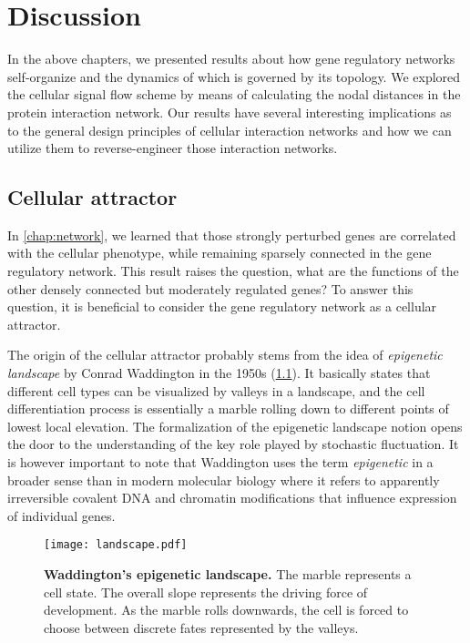 \chapter{Discussion}
In the above chapters, we presented results about how gene regulatory networks
self-organize and the dynamics of which is governed by its topology. We explored
the cellular signal flow scheme by means of calculating the nodal distances in
the protein interaction network. Our results have several interesting implications
as to the general design principles of cellular interaction networks and
how we can utilize them to reverse-engineer those interaction networks.

\section{Cellular attractor}
In \ref{chap:network}, we learned that those strongly perturbed genes are
correlated with the cellular phenotype, while remaining sparsely connected in
the gene regulatory network. This result raises the question, what are the
functions of the other densely connected but moderately regulated genes? 
To answer this question, it is beneficial to consider the gene regulatory network
as a cellular attractor.

The origin of the cellular attractor probably stems from the idea of 
\emph{epigenetic landscape} by Conrad Waddington in the 1950s 
(\ref{fig:landscape}). It basically
states that different cell types can be visualized by valleys in a landscape,
and the cell differentiation process is essentially a marble rolling down to
different points of lowest local elevation. The formalization of the epigenetic landscape notion opens the door to the understanding of the key role played by stochastic fluctuation. 
It is however important to note that Waddington uses the term \emph{epigenetic} in a broader sense than in modern molecular biology where it refers to apparently irreversible covalent DNA and chromatin modifications that influence expression of individual genes.

\begin{figure}[!ht]
\begin{center}
\texttt{[image: landscape.pdf]}
\end{center}
\caption[Waddington's epigenetic landscape]{
{\bf Waddington's epigenetic landscape.}
The marble represents a cell state. The overall slope represents the driving force of development. As the marble rolls downwards, the cell is forced to choose between discrete fates represented by the valleys.
}
\label{fig:landscape}
\end{figure}

